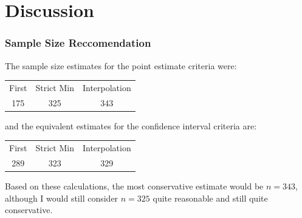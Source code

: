 \documentclass{beamer}\usepackage{knitr}
\begin{document}
% 
% 








\section{Discussion}


\begin{frame}[fragile]
\frametitle{Sample Size Reccomendation}

The sample size estimates for the point estimate criteria were:

\begin{center}
  \begin{tabular}{ccc}
    First & Strict Min & Interpolation \\
    175 & 325 & 343 \\
  \end{tabular}
\end{center}

and the equivalent estimates for the confidence interval criteria are:

\begin{center}
  \begin{tabular}{ccc}
    First & Strict Min & Interpolation \\
    289 & 323 & 329 \\
  \end{tabular}
\end{center}

Based on these calculations, the most conservative estimate would be $n = 343$, although I would still consider $n = 325$ quite reasonable and still quite conservative.

\end{frame}
\end{document}
